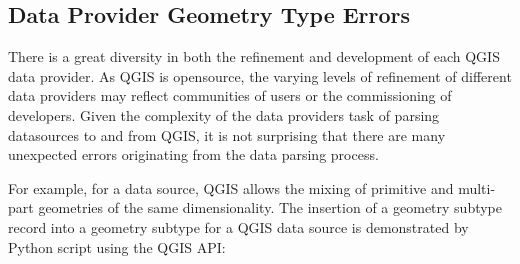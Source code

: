 \documentclass[a4paper,11pt,english]{sphinxmanual}
\begin{document}
\subsection{Data Provider Geometry Type Errors}
\label{\detokenize{QGISproblems:data-provider-geometry-type-errors}}
There is a great diversity in both the refinement and development of each QGIS data provider.  As QGIS is opensource, the varying levels of refinement of different data providers may reflect communities of users or the commissioning of developers.  Given the complexity of the data providers task of parsing datasources to and from QGIS, it is not surprising that there are many unexpected errors originating from the data parsing process.

For example, for a  data source, QGIS allows the mixing of primitive and multi-part geometries of the same dimensionality.  The insertion of a  geometry subtype record into a  geometry subtype for a QGIS  data source is demonstrated by Python script using the QGIS API:
\end{document}

